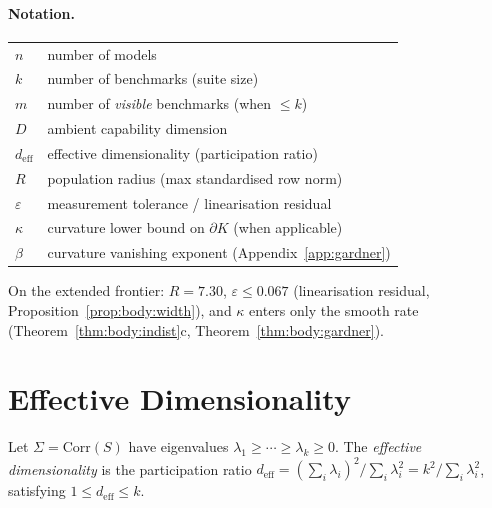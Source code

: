 \documentclass{article}
\begin{document}
\paragraph{Notation.}

\begin{center}\small
\begin{tabular}{ll}
$n$ & number of models \\
$k$ & number of benchmarks (suite size) \\
$m$ & number of \emph{visible} benchmarks (when $\le k$) \\
$D$ & ambient capability dimension \\
$d_{\mathrm{eff}}$ & effective dimensionality (participation ratio) \\
$R$ & population radius (max standardised row norm) \\
$\varepsilon$ & measurement tolerance / linearisation residual \\
$\kappa$ & curvature lower bound on $\partial K$ (when applicable) \\
$\beta$ & curvature vanishing exponent (Appendix~\ref{app:gardner}) \\
\end{tabular}
\end{center}
\noindent On the extended frontier: $R = 7.30$,
$\varepsilon \le 0.067$ (linearisation residual,
Proposition~\ref{prop:body:width}), and $\kappa$ enters only the
smooth rate (Theorem~\ref{thm:body:indist}c,
Theorem~\ref{thm:body:gardner}).

\section{Effective Dimensionality}

Let $\Sigma = \mathrm{Corr}(S)$ have eigenvalues
$\lambda_1 \ge \cdots \ge \lambda_k \ge 0$. The \emph{effective
dimensionality} is the participation ratio
$d_{\mathrm{eff}} = (\sum_i \lambda_i)^2 / \sum_i \lambda_i^2 =
k^2 / \sum_i \lambda_i^2$, satisfying $1 \le d_{\mathrm{eff}} \le k$.
\end{document}
